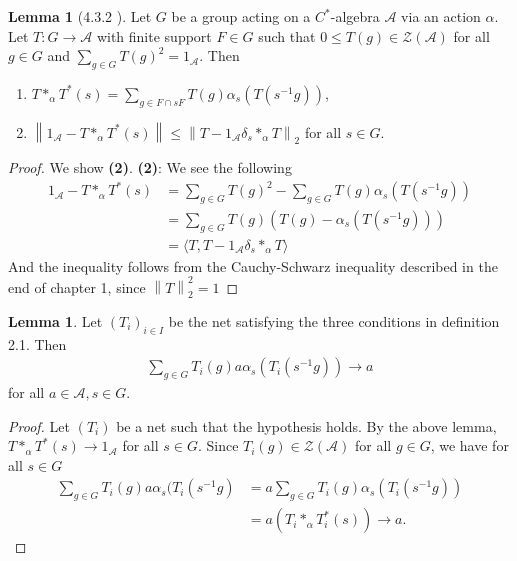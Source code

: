 \documentclass[10pt,oneside,openany,final]{memoir}
\theoremstyle{definition}
\newtheorem{lemma}[theorem]{Lemma}
\theoremstyle{Break}
\newcommand{\lv}{\left\lVert}
\newcommand{\rv}{\right\rVert}
\newcommand{\A}{\mathcal{A}}
\begin{document}
\begin{lemma}[4.3.2 \text{[BO]}]
Let $G$ be a group acting on a $C^*$-algebra $\A$ via an action $\alpha$. Let $T \colon G \to \A $ with finite support $F \in G$ such that $0 \leq T(g) \in \mathcal{Z}(\A)$ for all $g \in G$ and $\sum_{g \in G}T(g)^2=1_{\A}$. Then
\begin{enumerate}
\item $\displaystyle T \ast_{\alpha} T^*(s)=\sum_{g \in F \cap sF} T(g)\alpha_{s}(T(s^{-1}g))$, \\
\item $\lv 1_{\A} - T \ast_{\alpha}T^*(s)\rv \leq \lv T - 1_{\A} \delta_{s}\ast_{\alpha}T \rv_{2}$ for all $s \in G$.
\end{enumerate}
\begin{proof}
We show \textbf{(2)}. \textbf{(2)}: We see the following
\begin{align*}
1_{\A}-T \ast_{\alpha}T^*(s)&=\sum_{g \in G}T(g)^2- \sum_{g \in G}T(g)\alpha_{s}(T(s^{-1}g))\\
&=\sum_{g \in G} T(g)\left( T(g)-\alpha_{s}(T(s^{-1}g))\right)\\
&=\langle T,T-1_{\A}\delta_{s} \ast_{\alpha}T\rangle
\end{align*}
And the inequality follows from the Cauchy-Schwarz inequality described in the end of chapter 1, since $\lv T \rv_{2}^2=1$
\end{proof}
\end{lemma}
\begin{lemma}
Let $(T_{i})_{i \in I}$ be the net satisfying the three conditions in  definition 2.1. Then
\begin{align*}
\sum_{g \in G} T_{i}(g) a \alpha_{s}(T_{i}(s^{-1}g)) \to a
\end{align*}
for all $a \in \A, s \in G$.
\begin{proof}
Let $(T_{i})$ be a net such that the hypothesis holds. By the above lemma, $T\ast_{\alpha}T^*(s) \to 1_{\A}$ for all $s \in G$. Since $T_{i}(g) \in \mathcal{Z}(\A)$ for all $g \in G$, we have for all $s \in G$
\begin{align*}
\sum_{g \in G}T_{i}(g) a \alpha_{s}(T_{i}(s^{-1}g)&=a\sum_{g \in G}T_{i}(g)\alpha_{s}(T_{i}(s^{-1}g))\\ 
&=a \left(T_{i} \ast_{\alpha}T_{i}^*(s)\right)\to a.
\end{align*}
\end{proof}
\end{lemma}
\end{document}
